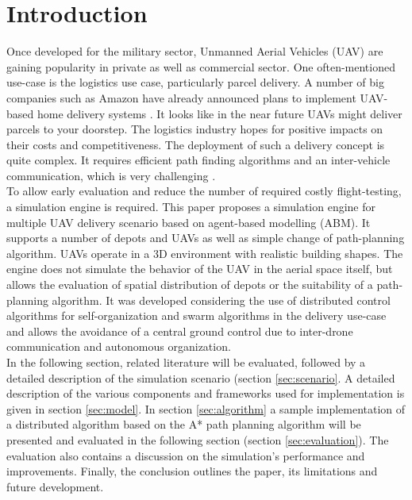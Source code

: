 \section{Introduction}
Once developed for the military sector, Unmanned Aerial Vehicles (UAV) are gaining popularity in private as well as commercial sector. One often-mentioned use-case is the logistics use case, particularly parcel delivery. A number of big companies such as Amazon have already announced plans to implement UAV-based home delivery systems \cite{stolaroff.2014}. It looks like in the near future UAVs might deliver parcels to your doorstep. The logistics industry hopes for positive impacts on their costs and competitiveness. The deployment of such a delivery concept is quite complex. It requires efficient path finding algorithms and an inter-vehicle communication, which is very challenging \cite{bekmezci.2013}.\\
To allow early evaluation and reduce the number of required costly flight-testing, a simulation engine is required. This paper proposes a simulation engine for multiple UAV delivery scenario based on agent-based modelling (ABM). It supports a number of depots and UAVs as well as simple change of path-planning algorithm. UAVs operate in a 3D environment with realistic building shapes. The engine does not simulate the behavior of the UAV in the aerial space itself, but allows the evaluation of spatial distribution of depots or the suitability of a path-planning algorithm. It was developed considering the use of distributed control algorithms for self-organization and swarm algorithms in the delivery use-case and allows the avoidance of a central ground control due to inter-drone communication and autonomous organization.\\
In the following section, related literature will be evaluated, followed by a detailed description of the simulation scenario (section \ref{sec:scenario}. A detailed description of the various components and frameworks used for implementation is given in section \ref{sec:model}. In section \ref{sec:algorithm} a sample implementation of a distributed algorithm based on the A* path planning algorithm \cite{hart.1968} will be presented and evaluated in the following section (section \ref{sec:evaluation}). The evaluation also contains a discussion on the simulation's performance and improvements. Finally, the conclusion outlines the paper, its limitations and future development.

